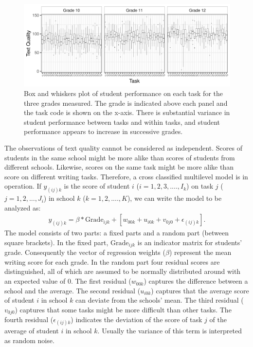 \documentclass[a4paper]{article}
\begin{document}
\begin{figure}[!ht]
	\includegraphics[width=\textwidth]{figures/descriptivesBaseline.pdf}
	\caption{Box and whiskers plot of student performance on each task for the three grades measured. The grade is indicated above each panel and the task code is shown on the x-axis. There is substantial variance in student performance between tasks and within tasks, and student performance appears to increase in successive grades.}
	\label{fig:baselineDescriptives}
\end{figure}
The observations of text quality cannot be considered as independent. Scores of students in the same school might be more alike than scores of students from different schools. Likewise, scores on the same task might be more alike than score on different writing tasks. Therefore, a cross classified multilevel model is in operation. If $y_{(ij)k}$ is the score of student $i$ ($i = 1, 2, 3, ...., I_k$) on task $j$ ($j = 1, 2, ..., J_i$) in school $k$ ($k = 1, 2, ...., K$), we can write the model to be analyzed as:
\begin{align*}
	y_{(ij)k} = \beta * \mathrm{Grade}_{ijk} + [w_{00k} + u_{i0k} + v_{0j0} + \epsilon_{(ij)k}].
\end{align*}
The model consists of two parts: a fixed parts and a random part (between square brackets). In the fixed part, $\mathrm{Grade}_{ijk}$ is an indicator matrix for students' grade. Consequently the vector of regression weights ($\beta$) represent the mean writing score for each grade. In the random part four residual scores are distinguished, all of which are assumed to be normally distributed around with an expected value of 0. The first residual ($w_{00k}$) captures the difference between a school and the average. The second residual ($u_{i0k}$) captures that the average score of student $i$ in school $k$ can deviate from the schools' mean. The third residual ($v_{0j0}$) captures that some tasks might be more difficult than other tasks. The fourth residual ($\epsilon_{(ij)k}$) indicates the deviation of the score of task $j$ of the average of student $i$ in school $k$. Usually the variance of this term is interpreted as random noise.
\end{document}

